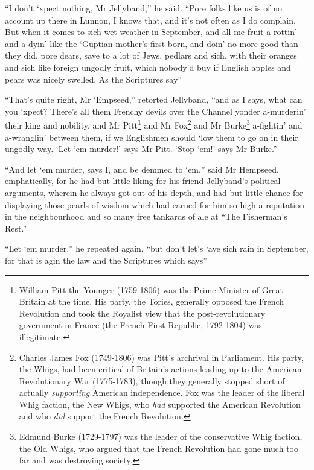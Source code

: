 \enquote{I don't `xpect nothing, Mr Jellyband,} he said. \enquote{Pore folks like us is of no account up there in Lunnon, I knows that, and it's not often as I do complain. But when it comes to sich wet weather in September, and all me fruit a-rottin’ and a-dyin’ like the `Guptian mother's first-born, and doin’ no more good than they did, pore dears, save to a lot of Jews, pedlars and sich, with their oranges and sich like foreign ungodly fruit, which nobody'd buy if English apples and pears was nicely swelled. As the Scriptures say\longdash}

\enquote{That's quite right, Mr `Empseed,} retorted Jellyband, \enquote{and as I says, what can you `xpect? There's all them Frenchy devils over the Channel yonder a-murderin’ their king and nobility, and Mr Pitt\footnote{William Pitt the Younger (1759-1806) was the Prime Minister of Great Britain at the time. His party, the Tories, generally opposed the French Revolution and took the Royalist view that the post-revolutionary government in France (the French First Republic, 1792-1804) was illegitimate.} and Mr Fox\footnote{Charles James Fox (1749-1806) was Pitt's archrival in Parliament. His party, the Whigs, had been critical of Britain's actions leading up to the American Revolutionary War (1775-1783), though they generally stopped short of actually \textit{supporting} American independence. Fox was the leader of the liberal Whig faction, the New Whigs, who \textit{had} supported the American Revolution and who \textit{did} support the French Revolution.} and Mr Burke\footnote{Edmund Burke (1729-1797) was the leader of the conservative Whig faction, the Old Whigs, who argued that the French Revolution had gone much too far and was destroying society.}  a-fightin’ and a-wranglin’ between them, if we Englishmen should `low them to go on in their ungodly way. \enquote{Let `em murder!} says Mr Pitt. \enquote{Stop `em!} says Mr Burke.}

\enquote{And let `em murder, says I, and be demmed to `em,} said Mr Hempseed, emphatically, for he had but little liking for his friend Jellyband's political arguments, wherein he always got out of his depth, and had but little chance for displaying those pearls of wisdom which had earned for him so high a reputation in the neighbourhood and so many free tankards of ale at \enquote{The Fisherman's Rest.}

\enquote{Let `em murder,} he repeated again, \enquote{but don't let's `ave sich rain in September, for that is agin the law and the Scriptures which says\longdash}

